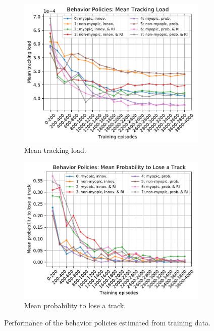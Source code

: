 \documentclass[english, 12pt, a4paper, elec, utf8, a-1b, online]{aaltothesis}
\numberwithin{equation}{section}
\begin{document}
\begin{figure}
    \centering
    \begin{subfigure}[b]{0.8\textwidth}
        \includegraphics[width=\textwidth]{figures/benchmark/Training/online_load.pdf}
        \caption{Mean tracking load.}
        \label{fig:online_load}
    \end{subfigure}
    \hfill
    \begin{subfigure}[b]{0.8\textwidth}
        \includegraphics[width=\textwidth]{figures/benchmark/Training/online_plt.pdf}
        \caption{Mean probability to lose a track.}
        \label{fig:online_lost}
    \end{subfigure}
    \caption{Performance of the behavior policies estimated from training data.}
    \label{fig:online_performance}
\end{figure}
\end{document}

